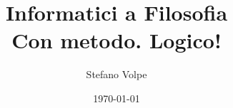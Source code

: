 \documentclass{beamer}
\title{%
  Informatici a Filosofia \\
  \normalsize Con metodo. Logico!
}
\author{Stefano Volpe}
\institute{Università di Bologna, corso di Laurea in Filosofia}
\date{\today}
\begin{document}
\frame{\titlepage}
\end{document}
